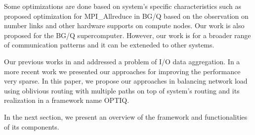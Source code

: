 Some optimizations are done based on system’s specific characteristics such as \cite{Kumar:Allreduce} proposed optimization for MPI\_Allreduce in BG/Q based on the observation on number links and other hardware supports on compute nodes. Our work is also proposed for the BG/Q supercomputer. However, our work is for a broader range of communication patterns and it can be exteneded to other systems.

Our previous works in \cite{Vishwanath:GLEAN} and \cite{SDAV:Bui2014b} addressed a problem of I/O data aggregation. In a more recent work \cite{hbui:bgq} we presented our approaches for improving the performance very sparse. In this paper, we propose our approaches in balancing network load using oblivious routing with multiple paths on top of system's routing and its realization in a framework name OPTIQ. 

In the next section, we present an overview of the framework and functionalities of its components.
